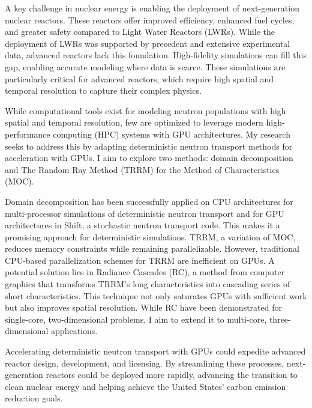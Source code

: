 \documentclass[12pt]{letter}
\begin{document}
A key challenge in nuclear energy is enabling the deployment of next-generation
nuclear reactors. These reactors offer improved efficiency, enhanced fuel
cycles, and greater safety compared to Light Water Reactors (LWRs). While the
deployment of LWRs was supported by precedent and extensive experimental data,
advanced reactors lack this foundation. High-fidelity simulations can fill this
gap, enabling accurate modeling where data is scarce. These simulations are
particularly critical for advanced reactors, which require high spatial and
temporal resolution to capture their complex physics.

While computational tools exist for modeling neutron populations with high
spatial and temporal resolution, few are optimized to leverage modern
high-performance computing (HPC) systems with GPU architectures. My research
seeks to address this by adapting deterministic neutron transport methods for
acceleration with GPUs. I aim to explore two methods: domain decomposition and
The Random Ray Method (TRRM) for the Method of Characteristics (MOC).

Domain decomposition has been successfully applied on CPU architectures for
multi-processor simulations of deterministic neutron transport and for GPU
architectures in Shift, a stochastic neutron transport code. This makes it a
promising approach for deterministic simulations. TRRM, a variation of MOC,
reduces memory constraints while remaining parallelizable. However, traditional
CPU-based parallelization schemes for TRRM are inefficient on GPUs. A potential
solution lies in Radiance Cascades (RC), a method from computer graphics that
transforms TRRM's long characteristics into cascading series of short
characteristics. This technique not only saturates GPUs with sufficient work
but also improves spatial resolution. While RC have been demonstrated for
single-core, two-dimensional problems, I aim to extend it to multi-core,
three-dimensional applications.

Accelerating deterministic neutron transport with GPUs could expedite advanced
reactor design, development, and licensing. By streamlining these processes,
next-generation reactors could be deployed more rapidly, advancing the
transition to clean nuclear energy and helping achieve the United States’
carbon emission reduction goals.
\end{document}
